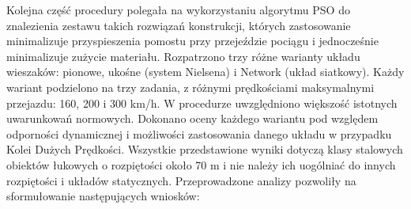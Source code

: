 Kolejna część procedury polegała na wykorzystaniu algorytmu PSO do znalezienia zestawu takich rozwiązań konstrukcji, których zastosowanie minimalizuje przyspieszenia pomostu przy przejeździe pociągu i jednocześnie minimalizuje zużycie materiału. Rozpatrzono trzy różne warianty układu wieszaków: pionowe, ukośne (system Nielsena) i Network (układ siatkowy). Każdy wariant podzielono na trzy zadania, z różnymi prędkościami maksymalnymi przejazdu: 160, 200 i 300 km/h. W procedurze uwzględniono większość istotnych uwarunkowań normowych.
Dokonano oceny każdego wariantu pod względem odporności dynamicznej i możliwości zastosowania danego układu w przypadku Kolei Dużych Prędkości. Wszystkie przedstawione wyniki dotyczą klasy stalowych obiektów łukowych o rozpiętości około 70 m i nie należy ich uogólniać do innych rozpiętości i układów statycznych. Przeprowadzone analizy pozwoliły na sformułowanie następujących wniosków:
